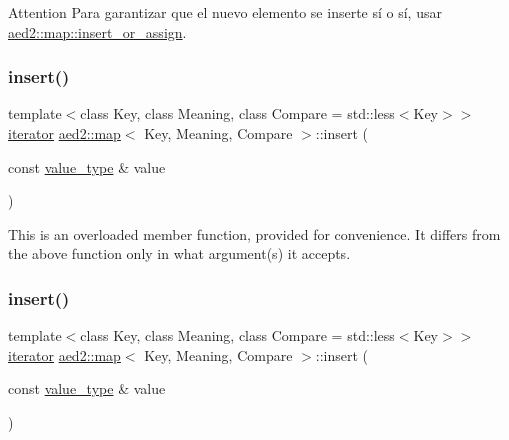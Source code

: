 \begin{DoxyAttention}{Attention}
Para garantizar que el nuevo elemento se inserte sí o sí, usar \hyperlink{classaed2_1_1map_a2ef6723c183916276b0afc4a4c721475}{aed2\+::map\+::insert\+\_\+or\+\_\+assign}. 
\end{DoxyAttention}
\mbox{\label{classaed2_1_1map_a60aacba06b1579630b3c8e996cf248c8}} 
\subsubsection{\texorpdfstring{insert()}{insert()}\hspace{0.1cm}{\footnotesize\ttfamily [3/4]}}
{\footnotesize\ttfamily template$<$class Key, class Meaning, class Compare = std\+::less$<$\+Key$>$$>$ \\
\hyperlink{classaed2_1_1map_1_1iterator}{iterator} \hyperlink{classaed2_1_1map}{aed2\+::map}$<$ Key, Meaning, Compare $>$\+::insert (\begin{DoxyParamCaption}\item[{const \hyperlink{classaed2_1_1map_a719db98e0ff9a837610f76be33264680}{value\+\_\+type} \&}]{value }\end{DoxyParamCaption})\hspace{0.3cm}{\ttfamily [inline]}}

This is an overloaded member function, provided for convenience. It differs from the above function only in what argument(s) it accepts. \mbox{\label{classaed2_1_1map_a60aacba06b1579630b3c8e996cf248c8}} 
\subsubsection{\texorpdfstring{insert()}{insert()}\hspace{0.1cm}{\footnotesize\ttfamily [4/4]}}
{\footnotesize\ttfamily template$<$class Key, class Meaning, class Compare = std\+::less$<$\+Key$>$$>$ \\
\hyperlink{classaed2_1_1map_1_1iterator}{iterator} \hyperlink{classaed2_1_1map}{aed2\+::map}$<$ Key, Meaning, Compare $>$\+::insert (\begin{DoxyParamCaption}\item[{const \hyperlink{classaed2_1_1map_a719db98e0ff9a837610f76be33264680}{value\+\_\+type} \&}]{value }\end{DoxyParamCaption})\hspace{0.3cm}{\ttfamily [inline]}}

